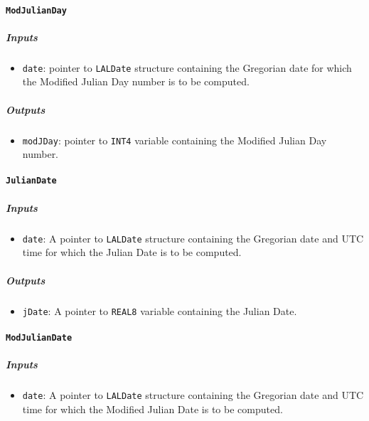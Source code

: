 \paragraph{\texttt{ModJulianDay}}

\subparagraph{Inputs}

\begin{itemize}
    \item \texttt{date}: pointer to \texttt{LALDate} structure containing
    the Gregorian date for which the Modified Julian Day number is to be
    computed.
\end{itemize}

\subparagraph{Outputs}

\begin{itemize}
    \item \texttt{modJDay}: pointer to \texttt{INT4} variable containing
    the Modified Julian Day number.
\end{itemize}

\paragraph{\texttt{JulianDate}}

\subparagraph{Inputs}

\begin{itemize}
    \item \texttt{date}: A pointer to \texttt{LALDate} structure containing
    the Gregorian date and UTC time for which the Julian Date is to be
    computed.
\end{itemize}

\subparagraph{Outputs}

\begin{itemize}
    \item \texttt{jDate}: A pointer to \texttt{REAL8} variable containing the
    Julian Date.
\end{itemize}

\paragraph{\texttt{ModJulianDate}}

\subparagraph{Inputs}

\begin{itemize}
    \item \texttt{date}: A pointer to \texttt{LALDate} structure containing
    the Gregorian date and UTC time for which the Modified Julian Date is
    to be computed.
\end{itemize}

